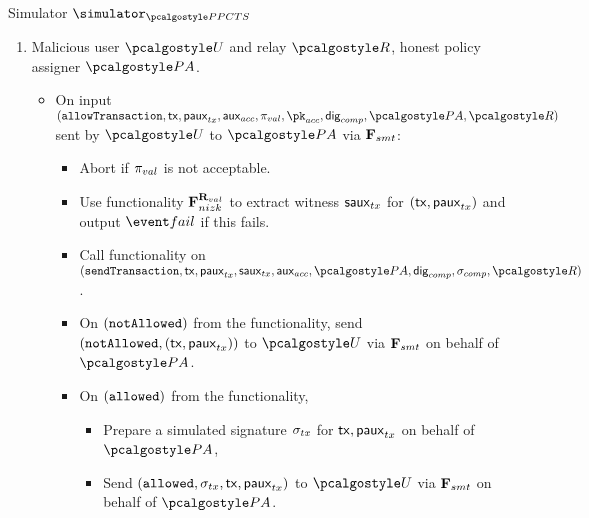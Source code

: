 \documentclass[runningheads,10pt]{llncs}
\numberwithin{equation}{section}
\begin{document}
\begin{simbox}{Simulator $\simulator_{\PPCTS}$}
\begin{enumerate}
\begin{itemize}
\begin{itemize}
      \item Prepare a simulated zero-knowledge proof $\zkproof_{val}$ for
        $\inp_{val} = (\tx, \paux_{tx}) \in \LAN_{\REL_{val}}$;
      \item Prepare a simulated zero-knowledge proof $\zkproof_{comp}$ for
        $\inp_{comp} = (\tx, \paux_{tx}, \pk_\polas, \auxpol) \in
        \LAN_{\REL_{comp}}$;
      \item Prepare $\txdata$.
      \item Send to $\relay$ via $\func{amt}$ message $(\sendTransaction,
        \txdata)$.
      \end{itemize}
    \end{itemize}
  \item Malicious user $\user$ and relay $\relay$, honest policy assigner
  $\polas$.
    \begin{itemize}
    \item On input $(\allowTransaction, \tx, \pauxtx, \auxacc, \zkproof_{val}, \pkacc,
      \policydig, \polas, \relay)$ sent by $\user$ to $\polas$ via
      $\mathbf{F}_{{smt}}$:
      \begin{itemize}
      \item Abort if $\zkproof_{val}$ is not acceptable.
      \item Use functionality $\mathbf{F}_{{nizk}}^{\mathbf{R}_{val}}$ to extract witness
        $\mathsf{saux}_{tx}$ for $(\mathsf{tx}, \mathsf{paux}_{tx})$ and output $\fail$ if this fails.
      \item Call functionality on $(\sendTransaction, \tx, \paux_{tx},
        \saux_{tx}, \auxacc, \polas, \policydig, \signature_{comp}, \relay)$.
      \item On $(\mathtt{notAllowed})$ from the functionality, send $(\mathtt{notAllowed},
        (\mathsf{tx}, \mathsf{paux}_{tx}))$ to $\user$ via $\mathbf{F}_{{smt}}$ on behalf of $\polas$.
      \item On $(\mathtt{allowed})$ from the functionality,
        \begin{itemize}
        \item Prepare a simulated signature $\sigma_{tx}$ for $\mathsf{tx},
          \mathsf{paux}_{tx}$ on behalf of $\polas$,
        \item Send $(\mathtt{allowed}, \sigma_{tx}, \mathsf{tx}, \mathsf{paux}_{tx})$ to $\user$ via
          $\mathbf{F}_{{smt}}$ on behalf of $\polas$.
        \end{itemize}
      \end{itemize}

\end{itemize}
\end{enumerate}
\end{simbox}
\end{document}

